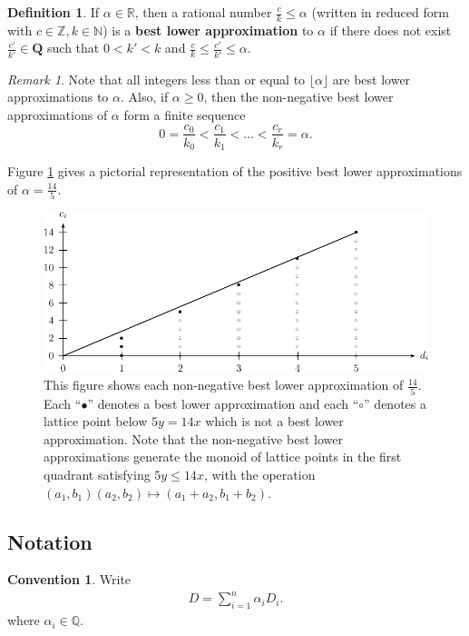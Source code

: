 \documentclass{amsart}
\theoremstyle{plain}
\theoremstyle{definition}
\newtheorem{defn}[thm]{Definition}
\newtheorem{convention}[thm]{Convention}
\theoremstyle{remark}
\newtheorem{rem}[thm]{Remark}
\numberwithin{equation}{section}
\newcommand\ssec{\subsection}
\newcommand\bn{{\mathbb N}}
\newcommand\br{{\mathbb R}}
\newcommand\bq{{\mathbb Q}}
\newcommand\bz{{\mathbb Z}}
\begin{document}
\begin{defn}
\label{defn:lower-approximation}
If $\alpha \in \br$, then a rational number $\frac{c}{k} \leq \alpha
$ (written in reduced form with $c \in \bz, k \in \bn$) is a
\textbf{best lower approximation} to $\alpha$ if there does not
exist $\frac{c'}{k'}\in \mathbf{Q}$ such that $0 < k'< k$ and
$\frac{c}{k} \le \frac{c'}{k'} \le \alpha$. 
\end{defn}

\begin{rem}
\label{rem:lower-approximation}
Note that all integers less than or equal to $\lfloor \alpha \rfloor$
are best lower approximations to $\alpha$. Also, if $\alpha \ge 0$,
then the non-negative best lower approximations of
$\alpha$ form a finite sequence
\[
	0 = \frac{c_0}{k_0} < \frac{c_1}{k_1} < \ldots < \frac{c_r}{k_r} = \alpha.
\]

\noindent
Figure \ref{fig:s14/5-lattice} gives a pictorial representation of the positive best lower approximations of $\alpha = \frac{14}{5}$.
\end{rem}

\begin{figure}
\includegraphics{pics/spin-lower-approximations-pic-pics.pdf}
\caption{This figure shows each non-negative best lower
approximation of $\frac{14}{5}.$ Each ``$\bullet$'' denotes a best
lower approximation and each ``$\circ$'' denotes a lattice point
below $5y=14x$ which is not a best lower approximation.  Note that
the non-negative best lower approximations generate the monoid of
lattice points in the first quadrant satisfying  $5y \le 14x$, with
the operation $(a_1, b_1)(a_2, b_2)\mapsto (a_1 + a_2, b_1 + b_2)$.}
\label{fig:s14/5-lattice}
\end{figure}

\ssec{Notation}
\begin{convention}
Write
\begin{align*}
	D = \sum_{i=1}^{n}\alpha_i D_i.
\end{align*}
where $\alpha_i \in \bq$. 
\end{convention}
\end{document}
